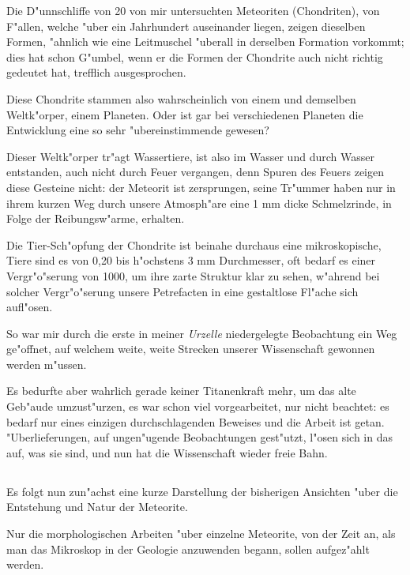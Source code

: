\documentclass[a4paper, 11pt, oneside]{article}
\begin{document}
Die D"unnschliffe von 20 von mir untersuchten Meteoriten (Chondriten), von F"allen, welche "uber ein Jahrhundert auseinander liegen, zeigen dieselben Formen, "ahnlich wie eine Leitmuschel "uberall in derselben Formation vorkommt; dies hat schon G"umbel, wenn er die Formen der Chondrite auch nicht richtig gedeutet hat, trefflich ausgesprochen.

Diese Chondrite stammen also wahrscheinlich von einem und demselben Weltk"orper, einem Planeten. Oder ist gar bei verschiedenen Planeten die Entwicklung eine so sehr "ubereinstimmende gewesen?

Dieser Weltk"orper tr"agt Wassertiere, ist also im Wasser und durch Wasser entstanden, auch nicht durch Feuer vergangen, denn Spuren des Feuers zeigen diese Gesteine nicht: der Meteorit ist zersprungen, seine Tr"ummer haben nur in ihrem kurzen Weg durch unsere Atmosph"are eine 1 mm dicke Schmelzrinde, in Folge der Reibungsw"arme, erhalten.

Die Tier-Sch"opfung der Chondrite ist beinahe durchaus eine mikroskopische, Tiere sind es von 0,20 bis h"ochstens 3 mm Durchmesser, oft bedarf es einer Vergr"o"serung von 1000, um ihre zarte Struktur klar zu sehen, w"ahrend bei solcher Vergr"o"serung unsere Petrefacten in eine gestaltlose Fl"ache sich aufl"osen.

So war mir durch die erste in meiner \emph{Urzelle} niedergelegte Beobachtung ein Weg ge"offnet, auf welchem weite, weite Strecken unserer Wissenschaft gewonnen werden m"ussen.

Es bedurfte aber wahrlich gerade keiner Titanenkraft mehr, um das alte Geb"aude umzust"urzen, es war schon viel vorgearbeitet, nur nicht beachtet: es bedarf nur eines einzigen durchschlagenden Beweises und die Arbeit ist getan. "Uberlieferungen, auf ungen"ugende Beobachtungen gest"utzt, l"osen sich in das auf, was sie sind, und nun hat die Wissenschaft wieder freie Bahn.
\clearpage
\subsection{}
\paragraph{}
Es folgt nun zun"achst eine kurze Darstellung der bisherigen Ansichten "uber die Entstehung und Natur der Meteorite.

Nur die morphologischen Arbeiten "uber einzelne Meteorite, von der Zeit an, als man das Mikroskop in der Geologie anzuwenden begann, sollen aufgez"ahlt werden.
\end{document}
